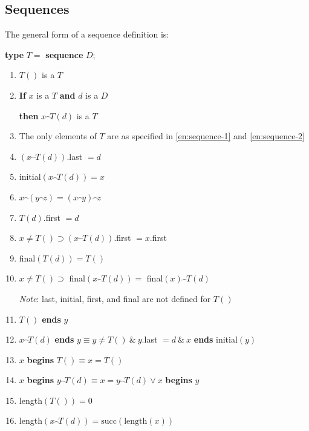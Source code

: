 \documentclass[twoside,11pt]{book}
\let\wideparen\overparen
\begin{document}
\subsection{Sequences}

The general form of a sequence definition is:

\quad \textbf{type} $T =$ \textbf{sequence} $D$;

\begin{enumerate}[wide, nosep, label=(\arabic*)]
	\item \label{en:sequence-1}
	$T()$ is a $T$
	
	\item \label{en:sequence-2}
	\textbf{If} $x$ is a $T$ \textbf{and} $d$ is a $D$
	
	\qquad\quad \textbf{then} $x\wideparen{\ \ }T(d)$ is a $T$

	\item The only elements of $T$ are as specified in \ref{en:sequence-1} and \ref{en:sequence-2}

	\item $(x\wideparen{\ \ }T(d))$.last $= d$

	\item initial$(x\wideparen{\ \ }T(d)) = x$
	\item $x\wideparen{\ \ }(y\wideparen{\ \ }z) = (x\wideparen{\ \ }y)\wideparen{\ \ }z$
	\item $T(d)$.first $= d$
	\item $x \neq T() \supset (x\wideparen{\ \ }T(d))$.first $= x$.first
	\item final$(T(d)) = T()$
	\item $x \neq T() \supset$ final$(x\wideparen{\ \ }T(d)) =$ final$(x)\wideparen{\ \ }T(d)$

	\noindent
	\textit{Note}: last, initial, first, and final are not defined for $T()$

	\item $T()$ \textbf{ends} $y$
	\item $x\wideparen{\ \ }T(d)$ \textbf{ends} $y \equiv y \neq T()\ \&\ y$.last $= d\ \&\ x$ \textbf{ends} initial$(y)$
	\item $x$ \textbf{begins} $T() \equiv x = T()$
	\item $x$ \textbf{begins} $y\wideparen{\ \ }T(d) \equiv x = y\wideparen{\ \ }T(d) \lor x$ \textbf{begins} $y$
	\item length$(T()) = 0$
	\item length$(x\wideparen{\ \ }T(d)) = \text{succ}(\text{length}(x))$


\end{enumerate}
\end{document}
